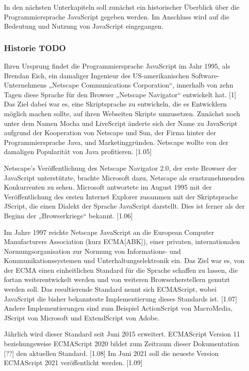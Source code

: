 In den nächsten Unterkapiteln soll zunächst ein historischer Überblick über die Programmiersprache JavaScript gegeben werden. Im Anschluss wird auf die Bedeutung und Nutzung von JavaScript eingegangen. 
\newline

\subsubsection{Historie TODO }
Ihren Ursprung findet die Programmiersprache JavaScript im Jahr 1995, als Brendan Eich, ein damaliger Ingenieur des US-amerikanischen Software-Unternehmens „Netscape Communications Corporation“, innerhalb von zehn Tagen diese Sprache für den Browser „Netscape Navigator“ entwickelt hat. [1] Das Ziel dabei war es, eine Skriptsprache zu entwickeln, die es Entwicklern möglich machen sollte, auf ihren Webseiten Skripte umzusetzen. Zunächst noch unter dem Namen Mocha und LiveScript änderte sich der Name zu JavaScript aufgrund der Kooperation von Netscape und Sun, der Firma hinter der Programmiersprache Java, und Marketinggründen. Netscape wollte von der damaligen Popularität von Java profitieren. [1.05] 
\newline

Netscape’s Veröffentlichung des Netscape Navigator 2.0, der erste Browser der JavaScript unterstützte, brachte Microsoft dazu, Netscape als ernstzunehmenden Konkurrenten zu sehen. 
Microsoft antwortete im August 1995 mit der Veröffentlichung des ersten Internet Explorer zusammen mit der Skriptsprache JScript, die einen Dialekt der Sprache JavaScript darstellt. Dies ist ferner als der Beginn der „Browserkriege“ bekannt. [1.06] \newline

Im Jahre 1997 reichte Netscape JavaScript an die European Computer Manufacturers Association (kurz ECMA[ABK]), einer privaten, internationalen Normungsorganisation zur Normung von Informations- und Kommunikationssystemen und Unterhaltungselektronik  ein. Das Ziel war es, von der ECMA einen einheitlichen Standard für die Sprache schaffen zu lassen, die fortan weiterentwickelt werden und von weiteren Browserherstellern genutzt werden soll. Das resultierende Standard nennt sich ECMAScript, wobei JavaScript die bisher bekannteste Implementierung dieses Standards ist. [1.07] Andere Implementierungen sind zum Beispiel ActionScript von Macro\-Media, JScript von Microsoft und ExtendScript von Adobe.
\newline
 
Jährlich wird dieser Standard seit Juni 2015 erweitert. ECMAScript Version 11 beziehungs\-weise ECMAScript 2020 bildet zum Zeitraum dieser Dokumentation [??] den aktuellen Standard. [1.08] 
Im Juni 2021 soll die neueste Version ECMAScript 2021 veröffentlicht werden.  [1.09]
\newline

